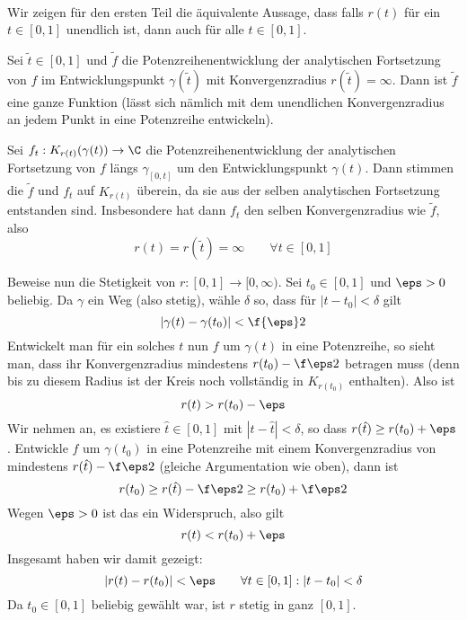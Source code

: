\documentclass[a4paper]{scrartcl}
\begin{document}
	\setcounter{section}{8}

	\begin{aufgabe}~

		Wir zeigen für den ersten Teil die äquivalente Aussage, dass falls $r(t)$ für ein $t\in [0,1]$ unendlich ist, dann auch für alle $t\in [0,1]$.

		Sei $\tilde t \in [0,1]$ und $\tilde f$ die Potenzreihenentwicklung der analytischen Fortsetzung von $f$ im Entwicklungspunkt $\gamma(\tilde t)$ mit Konvergenzradius $r(\tilde t) = \infty$.
		Dann ist $\tilde f$ eine ganze Funktion (lässt sich nämlich mit dem unendlichen Konvergenzradius an jedem Punkt in eine Potenzreihe entwickeln).

		Sei $f_t: K_{r(t)}(\gamma(t)) \to \C$ die Potenzreihenentwicklung der analytischen Fortsetzung von $f$ längs $\gamma_{[0,t]}$ um den Entwicklungspunkt $\gamma(t)$.
		Dann stimmen die $\tilde f$ und $f_t$ auf $K_{r(t)}$ überein, da sie aus der selben analytischen Fortsetzung entstanden sind.
		Insbesondere hat dann $f_t$ den selben Konvergenzradius wie $\tilde f$, also
		\[
			r(t) = r(\tilde t) = \infty
			\qquad \forall t \in [0,1]
		\]

		Beweise nun die Stetigkeit von $r:[0,1] \to [0,\infty)$.
		Sei $t_0 \in [0,1]$ und $\eps > 0$ beliebig.
		Da $\gamma$ ein Weg (also stetig), wähle $\delta$ so, dass für $|t-t_0|<\delta$ gilt
		\[
			|\gamma(t) - \gamma(t_0)| < \f {\eps}2
		\]
		Entwickelt man für ein solches $t$ nun $f$ um $\gamma(t)$ in eine Potenzreihe, so sieht man, dass ihr Konvergenzradius mindestens $r(t_0) - \f \eps 2$ betragen muss (denn bis zu diesem Radius ist der Kreis noch vollständig in $K_{r(t_0)}$ enthalten).
		Also ist 
		\[
			r(t) > r(t_0) - \eps
		\]
		Wir nehmen an, es existiere $\hat t \in [0,1]$ mit $|t - \hat t| < \delta$, so dass $r(\hat t) \ge r(t_0) + \eps$.
		Entwickle $f$ um $\gamma(t_0)$ in eine Potenzreihe mit einem Konvergenzradius von mindestens $r(\hat t) - \f \eps 2$ (gleiche Argumentation wie oben), dann ist
		\[
			r(t_0) \ge r(\hat t) - \f \eps 2 \ge r(t_0) + \f \eps 2
		\]
		Wegen $\eps > 0$ ist das ein Widerspruch, also gilt 
		\[
			r(t) < r(t_0) + \eps
		\]
		Insgesamt haben wir damit gezeigt:
		\[
			|r(t) - r(t_0)| < \eps
			\qquad \forall t\in[0,1]: |t-t_0| < \delta
		\]
		Da $t_0\in [0,1]$ beliebig gewählt war, ist $r$ stetig in ganz $[0,1]$.
	\end{aufgabe}

	\newpage
	
\end{document}
